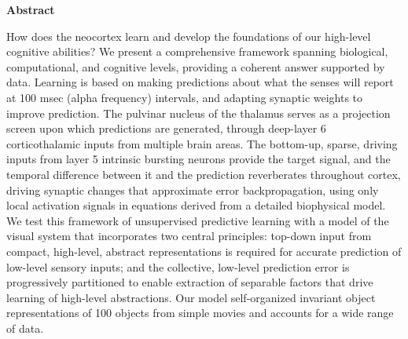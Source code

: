 \documentclass[10pt,twocolumn]{article}
\newif\myifpdf
\begin{document}


\sloppy
\raggedbottom


\begin{center}
\textbf{Abstract}
\end{center}
How does the neocortex learn and develop the foundations of our high-level cognitive abilities?  We present a comprehensive framework spanning biological, computational, and cognitive levels, providing a coherent answer supported by data. Learning is based on making predictions about what the senses will report at 100 msec (alpha frequency) intervals, and adapting synaptic weights to improve prediction. The pulvinar nucleus of the thalamus serves as a projection screen upon which predictions are generated, through deep-layer 6 corticothalamic inputs from multiple brain areas. The bottom-up, sparse, driving inputs from layer 5 intrinsic bursting neurons provide the target signal, and the temporal difference between it and the prediction reverberates throughout cortex, driving synaptic changes that approximate error backpropagation, using only local activation signals in equations derived from a detailed biophysical model. We test this framework of unsupervised predictive learning with a model of the visual system that incorporates two central principles: top-down input from compact, high-level, abstract representations is required for accurate prediction of low-level sensory inputs; and the collective, low-level prediction error is progressively partitioned to enable extraction of separable factors that drive learning of high-level abstractions. Our model self-organized invariant object representations of 100 objects from simple movies and accounts for a wide range of data.\\
\newline
{}
\newline
\end{document}

